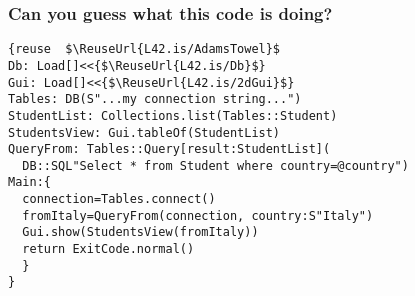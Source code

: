 
\begin{frame}[fragile]
\frametitle{Can you guess what this code is doing?}
\begin{NiceCode}{59ex}{1}
\begin{lstlisting}
{reuse  $\ReuseUrl{L42.is/AdamsTowel}$
Db: Load[]<<{$\ReuseUrl{L42.is/Db}$}
Gui: Load[]<<{$\ReuseUrl{L42.is/2dGui}$}
Tables: DB(S"...my connection string...")
StudentList: Collections.list(Tables::Student)
StudentsView: Gui.tableOf(StudentList)
QueryFrom: Tables::Query[result:StudentList](
  DB::SQL"Select * from Student where country=@country")
Main:{
  connection=Tables.connect()
  fromItaly=QueryFrom(connection, country:S"Italy")
  Gui.show(StudentsView(fromItaly))
  return ExitCode.normal()
  }
}
\end{lstlisting}
\end{NiceCode}
\end{frame}



